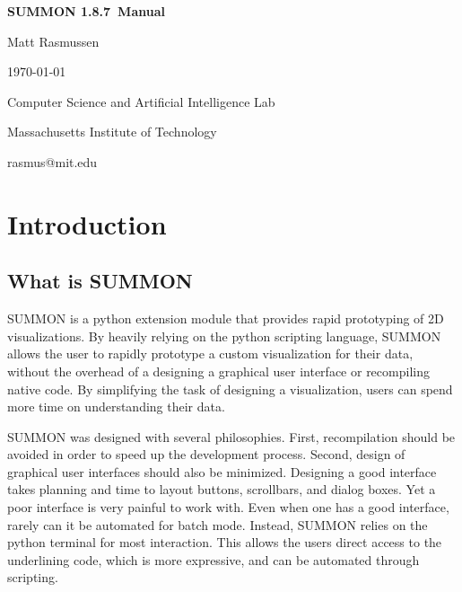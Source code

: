 \documentclass[12pt]{article}
\newcommand{\version}{1.8.7}
\begin{document}
\begin{titlepage}

\begin{center}

\vspace*{2.5in}

{\huge \bf {}\selectfont 
SUMMON \version\ Manual
}
\vspace*{.5in}

{\large
Matt Rasmussen

\today
}
\vspace*{.5in}

Computer Science and Artificial Intelligence Lab

Massachusetts Institute of Technology

\vspace*{.25in}

rasmus@mit.edu
\end{center}

\end{titlepage}


\tableofcontents

\clearpage

\section{Introduction}
\label{sec:intro}


\subsection{What is SUMMON}

SUMMON is a python extension module that provides rapid prototyping of 2D
visualizations.  By heavily relying on the python scripting language, SUMMON
allows the user to rapidly prototype a custom visualization for their data, 
without the overhead of a designing a graphical user interface or recompiling 
native code.  By simplifying the task of designing a visualization, users can 
spend more time on understanding their data. 

SUMMON was designed with several philosophies.  First, recompilation should
be avoided in order to speed up the development process.  Second, design of
graphical user interfaces should also be minimized.  Designing a good interface
takes planning and time to layout buttons, scrollbars, and dialog boxes.  Yet a 
poor interface is very painful to work with. Even when one has a good interface,
rarely can it be automated for batch mode.  Instead, SUMMON relies on the python
terminal for most interaction.  This allows the users direct access to  the
underlining code, which is more expressive, and can be automated through
scripting.  
\end{document}
